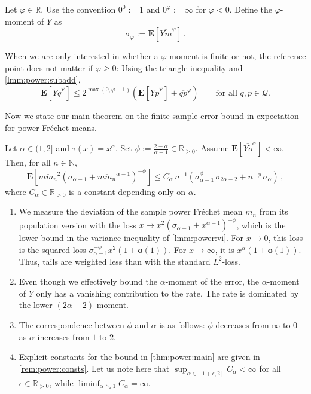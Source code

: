 \documentclass{article}
\newcommand*{\mc}[1]{\mathcal{#1}}
\newcommand*{\mo}[1]{\mathbf{#1}}
\newcommand{\N}{\mathbb{N}}
\newcommand{\R}{\mathbb{R}}
\newcommand{\Rp}{\R_{\geq0}}
\newcommand{\Rpp}{\R_{>0}}
\newcommand{\lab}{\left[} %
\newcommand{\rab}{\right]} %
\newcommand{\ab}[1]{\lab #1 \rab} %
\newcommand{\abOf}[1]{\!\ab{#1}} %
\newcommand{\lb}{\left(} %
\newcommand{\rb}{\right)} %
\newcommand{\br}[1]{\lb #1 \rb} %
\newcommand{\E}{\mathbf{E}} %
\newcommand{\Eof}[1]{\E[#1]}
\newcommand{\EOf}[1]{\E\abOf{#1}}
\newcommand{\eqcm}{\,,} %
\newcommand{\eqfs}{\,.}
\newcommand{\ol}[2]{\overline{#1#2}}
\newcommand{\tran}{\tau}
\begin{document}
\begin{notation}\label{def:power:moments}
    Let $\varphi\in\R$. Use the convention $0^0:= 1$ and $0^{\varphi} := \infty$ for $\varphi<0$. Define the $\varphi$-moment of $Y$ as
    \begin{equation}
        \sigma_{\varphi} := \EOf{\ol Ym^\varphi}
        \eqfs
    \end{equation}
\end{notation}
%
\begin{remark}
    When we are only interested in whether a $\varphi$-moment is finite or not, the reference point does not matter if $\varphi \geq0$: Using the triangle inequality and \cref{lmm:power:subadd}, 
    \begin{equation}
        \EOf{\ol Yq^\varphi} \leq 2^{\max(0, \varphi-1)} \br{\EOf{\ol Yp^\varphi} + \ol qp^\varphi}
        \qquad \text{for all $q,p\in\mc Q$.}
    \end{equation}
\end{remark}
%
Now we state our main theorem on the finite-sample error bound in expectation for power Fr\'echet means.
%
%
\begin{theorem}\label{thm:power:main}
    Let $\alpha \in (1,2]$ and $\tran(x)=x^\alpha$.
    Set $\phi := \frac{2-\alpha}{\alpha-1} \in \Rp$.
    Assume $\Eof{\ol{Y}o^\alpha}<\infty$.
    Then, for all $n\in\N$,
    \begin{equation}\label{eq:power:main}
        \EOf{\ol{m}{m_n}^2 \br{\sigma_{\alpha-1} + \ol{m}{m_n}^{\alpha-1}}^{-\phi}}
        \leq
        C_\alpha\, n^{-1} \br{\sigma_{\alpha-1}^{\phi}\, \sigma_{2\alpha-2} + n^{-\phi}\, \sigma_\alpha}
        \eqcm
    \end{equation}
    where $C_\alpha\in\Rpp$ is a constant depending only on $\alpha$.
\end{theorem}
%
\begin{remark}\mbox{}
    \begin{enumerate}[label=(\roman*)]
        \item We measure the deviation of the sample power Fr\'echet mean $m_n$ from its population version with the loss $x \mapsto x^2(\sigma_{\alpha-1} + x^{\alpha-1})^{-\phi}$, which is the lower bound in the variance inequality of \cref{lmm:power:vi}. For $x\to 0$, this loss is the squared loss $\sigma_{\alpha-1}^{-\phi} x^2 (1 + \mo o(1))$. For $x\to \infty$, it is $x^\alpha (1 + \mo o(1))$. Thus, tails are weighted less than with the standard $L^2$-loss.
        \item Even though we effectively bound the $\alpha$-moment of the error, the $\alpha$-moment of $Y$ only has a vanishing contribution to the rate. The rate is dominated by the lower $(2\alpha-2)$-moment.
        \item The correspondence between $\phi$ and $\alpha$ is as follows: $\phi$ decreases from $\infty$ to $0$ as $\alpha$ increases from $1$ to $2$.
        \item Explicit constants for the bound in \cref{thm:power:main} are given in \cref{rem:power:consts}. Let us note here that $\sup_{\alpha\in[1+\epsilon, 2]}C_\alpha < \infty$ for all $\epsilon\in\Rpp$, while $\liminf_{\alpha\searrow1} C_\alpha = \infty$.
    \end{enumerate}
\end{remark}
\end{document}
